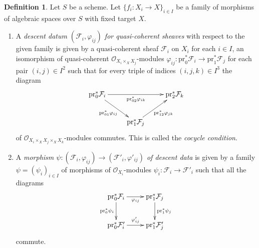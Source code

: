 \documentclass{stacks-project}
\theoremstyle{plain}
\theoremstyle{definition}
\newtheorem{definition}[subsection]{Definition}
\theoremstyle{remark}
\numberwithin{equation}{subsection}
\begin{document}
\begin{definition}
\label{definition-descent-datum-quasi-coherent}
Let $S$ be a scheme. Let $\{f_i : X_i \to X\}_{i \in I}$ be a family
of morphisms of algebraic spaces over $S$ with fixed target $X$.
\begin{enumerate}
\item A {\it descent datum $(\mathcal{F}_i, \varphi_{ij})$
for quasi-coherent sheaves} with respect to the given family
is given by a quasi-coherent sheaf $\mathcal{F}_i$ on $X_i$ for
each $i \in I$, an isomorphism of quasi-coherent
$\mathcal{O}_{X_i \times_X X_j}$-modules
$\varphi_{ij} : \text{pr}_0^*\mathcal{F}_i \to \text{pr}_1^*\mathcal{F}_j$
for each pair $(i, j) \in I^2$
such that for every triple of indices $(i, j, k) \in I^3$ the
diagram
$$
\xymatrix{
\text{pr}_0^*\mathcal{F}_i \ar[rd]_{\text{pr}_{01}^*\varphi_{ij}}
\ar[rr]_{\text{pr}_{02}^*\varphi_{ik}} & &
\text{pr}_2^*\mathcal{F}_k \\
& \text{pr}_1^*\mathcal{F}_j \ar[ru]_{\text{pr}_{12}^*\varphi_{jk}} &
}
$$
of $\mathcal{O}_{X_i \times_X X_j \times_X X_k}$-modules
commutes. This is called the {\it cocycle condition}.
\item A {\it morphism $\psi : (\mathcal{F}_i, \varphi_{ij}) \to
(\mathcal{F}'_i, \varphi'_{ij})$ of descent data} is given
by a family $\psi = (\psi_i)_{i\in I}$ of morphisms of
$\mathcal{O}_{X_i}$-modules $\psi_i : \mathcal{F}_i \to \mathcal{F}'_i$
such that all the diagrams
$$
\xymatrix{
\text{pr}_0^*\mathcal{F}_i \ar[r]_{\varphi_{ij}} \ar[d]_{\text{pr}_0^*\psi_i}
& \text{pr}_1^*\mathcal{F}_j \ar[d]^{\text{pr}_1^*\psi_j} \\
\text{pr}_0^*\mathcal{F}'_i \ar[r]^{\varphi'_{ij}} &
\text{pr}_1^*\mathcal{F}'_j \\
}
$$
commute.
\end{enumerate}
\end{definition}
\end{document}
